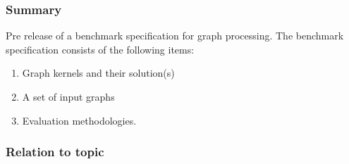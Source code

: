 \cite{beamer2015gap}
\subsubsection{Summary}
Pre release of a benchmark specification for graph processing.
The benchmark specification consists of the following items:
\begin{enumerate}
\item Graph kernels and their solution(s)
\item A set of input graphs
\item Evaluation methodologies.
\end{enumerate}

\subsubsection{Relation to topic}
